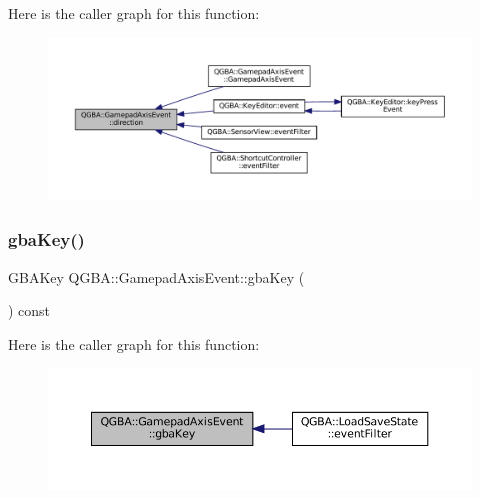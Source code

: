Here is the caller graph for this function\+:
\nopagebreak
\begin{figure}[H]
\begin{center}
\leavevmode
\includegraphics[width=350pt]{class_q_g_b_a_1_1_gamepad_axis_event_aa4348e9085dd4cd22d9b0f84a033a3d5_icgraph}
\end{center}
\end{figure}
\mbox{\label{class_q_g_b_a_1_1_gamepad_axis_event_abb9d09a8363acca86365a00d0b54037d}} 
\subsubsection{\texorpdfstring{gba\+Key()}{gbaKey()}}
{\footnotesize\ttfamily G\+B\+A\+Key Q\+G\+B\+A\+::\+Gamepad\+Axis\+Event\+::gba\+Key (\begin{DoxyParamCaption}{ }\end{DoxyParamCaption}) const\hspace{0.3cm}{\ttfamily [inline]}}

Here is the caller graph for this function\+:
\nopagebreak
\begin{figure}[H]
\begin{center}
\leavevmode
\includegraphics[width=350pt]{class_q_g_b_a_1_1_gamepad_axis_event_abb9d09a8363acca86365a00d0b54037d_icgraph}
\end{center}
\end{figure}
\mbox{\label{class_q_g_b_a_1_1_gamepad_axis_event_ab9500aceac79b152a5e6a3ee90922f6b}} 

